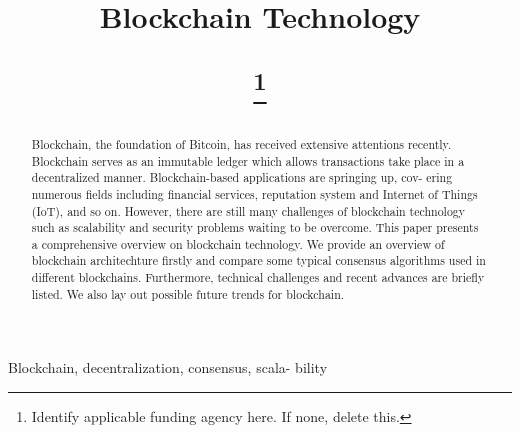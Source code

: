 \documentclass[conference]{IEEEtran}
\begin{document}
\title{Blockchain Technology

\thanks{Identify applicable funding agency here. If none, delete this.}
}


\author{
}

\maketitle

\begin{abstract}
Blockchain, the foundation of Bitcoin, has received
extensive attentions recently. Blockchain serves as an immutable
ledger which allows transactions take place in a decentralized
manner. Blockchain-based applications are springing up, cov-
ering numerous fields including financial services, reputation
system and Internet of Things (IoT), and so on. However,
there are still many challenges of blockchain technology such
as scalability and security problems waiting to be overcome.
This paper presents a comprehensive overview on blockchain
technology. We provide an overview of blockchain architechture
firstly and compare some typical consensus algorithms used
in different blockchains. Furthermore, technical challenges and
recent advances are briefly listed. We also lay out possible future
trends for blockchain.
\end{abstract}

\begin{IEEEkeywords}
Blockchain, decentralization, consensus, scala-
bility
\end{IEEEkeywords}
\end{document}
